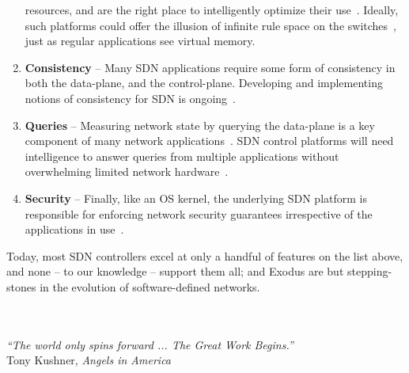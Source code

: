 \begin{enumerate}
resources, and are the right place to intelligently optimize their use~\cite{Curtis:2011,Yu:2010,Kang:2013optimizing,Kanizo:2013palette}. Ideally, such platforms
could offer the illusion of infinite rule space on the switches~\cite{naga-cacheflow}, just as regular applications see
virtual memory.
\item {\bf Consistency} -- Many SDN applications require some form of consistency in both the
data-plane, and the control-plane. Developing and implementing notions of consistency for
SDN is ongoing~\cite{reitblatt12consistent,ratul,of.cpp,sdn-transactions}.
\item {\bf Queries} -- Measuring network state by querying the data-plane is a key component of
many network applications~\cite{alfares10hedera,etc}. SDN control platforms will need intelligence to answer
queries from multiple applications without overwhelming limited network hardware~\cite{Rotsos:2012oflops}.
\item{\bf Security} -- Finally, like an OS kernel, the underlying SDN platform is responsible for enforcing
network security guarantees irrespective of the applications in use~\cite{paper_one,paper_two}.
\end{enumerate}

Today, most SDN controllers excel at only a handful of features on the list above, and none -- to our knowledge --
support them all; \sys and Exodus are but stepping-stones in the evolution of software-defined networks.

\ \\
\ \\
{\raggedleft{}
\emph{``The world only spins forward ... The Great Work Begins.''}\\
\hfill Tony Kushner, \emph{Angels in America}
}




